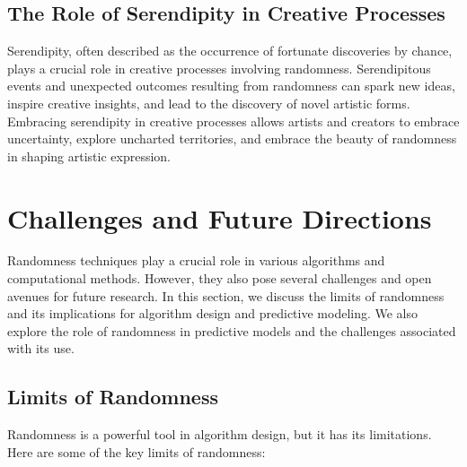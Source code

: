 \documentclass[12pt]{book} %
\begin{document}
\subsection{The Role of Serendipity in Creative Processes}

Serendipity, often described as the occurrence of fortunate discoveries by chance, plays a crucial role in creative processes involving randomness. Serendipitous events and unexpected outcomes resulting from randomness can spark new ideas, inspire creative insights, and lead to the discovery of novel artistic forms. Embracing serendipity in creative processes allows artists and creators to embrace uncertainty, explore uncharted territories, and embrace the beauty of randomness in shaping artistic expression.


\section{Challenges and Future Directions}
Randomness techniques play a crucial role in various algorithms and computational methods. However, they also pose several challenges and open avenues for future research. In this section, we discuss the limits of randomness and its implications for algorithm design and predictive modeling. We also explore the role of randomness in predictive models and the challenges associated with its use.

\subsection{Limits of Randomness}
Randomness is a powerful tool in algorithm design, but it has its limitations. Here are some of the key limits of randomness:
\end{document}
